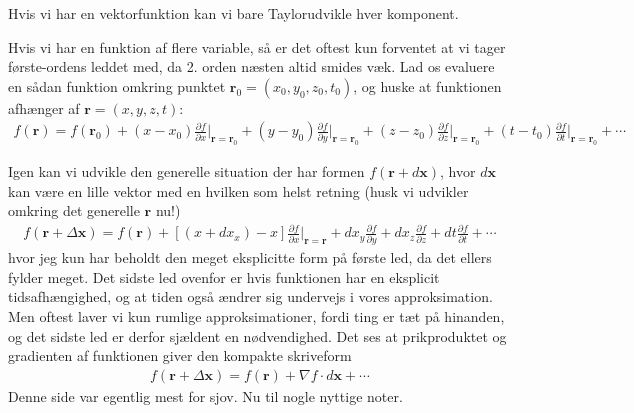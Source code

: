 \documentclass[a4paper]{article}
\begin{document}
    Hvis vi har en vektorfunktion kan vi bare Taylorudvikle hver komponent. 
    
    Hvis vi har en funktion af flere variable, så er det oftest kun forventet at vi tager første-ordens leddet med, da 2. orden næsten altid smides væk. Lad os evaluere en sådan funktion omkring punktet \(\mathbf{r}_0 = (x_0, y_0, z_0, t_0)\), og huske at funktionen afhænger af \(\mathbf{r} = (x, y, z, t)\):
    \begin{align*}
        f(\mathbf{r}) = f(\mathbf{r}_0) + (x - x_0)\frac{\partial f}{\partial x}\Bigr|_{\mathbf{r} = \mathbf{r}_{0} } + (y - y_0)\frac{\partial f}{\partial y}\Bigr|_{\mathbf{r} = \mathbf{r}_{0} } + (z - z_0)\frac{\partial f}{\partial z}\Bigr|_{\mathbf{r} = \mathbf{r}_{0} } + (t - t_0)\frac{\partial f}{\partial t}\Bigr|_{\mathbf{r} = \mathbf{r}_{0} } + \cdots
    \end{align*}

    Igen kan vi udvikle den generelle situation der har formen \(f(\mathbf{r} + d \mathbf{x})\), hvor \(d\mathbf{x}\) kan være en lille vektor med en hvilken som helst retning (husk vi udvikler omkring det generelle \(\mathbf{r}\) nu!) \begin{align*}
        f(\mathbf{r} + \Delta \mathbf{x}) = f(\mathbf{r}) + \left[ (x + dx_x) - x \right]\frac{\partial f}{\partial x}\Bigr|_{\mathbf{r} = \mathbf{r}} + dx_y\frac{\partial f}{\partial y} + dx_z\frac{\partial f}{\partial z} + dt\frac{\partial f}{\partial t} + \cdots  
    \end{align*}
    hvor jeg kun har beholdt den meget eksplicitte form på første led, da det ellers fylder meget. Det sidste led ovenfor er hvis funktionen har en eksplicit tidsafhængighed, og at tiden også ændrer sig undervejs i vores approksimation. Men oftest laver vi kun rumlige approksimationer, fordi ting er tæt på hinanden, og det sidste led er derfor sjældent en nødvendighed. Det ses at prikproduktet og gradienten af funktionen giver den kompakte skriveform \begin{align*}
        f(\mathbf{r} + \Delta \mathbf{x}) = f(\mathbf{r}) + \nabla f \cdot d \mathbf{x} + \cdots 
    \end{align*}
    Denne side var egentlig mest for sjov. Nu til nogle nyttige noter.
    \newpage
\end{document}

